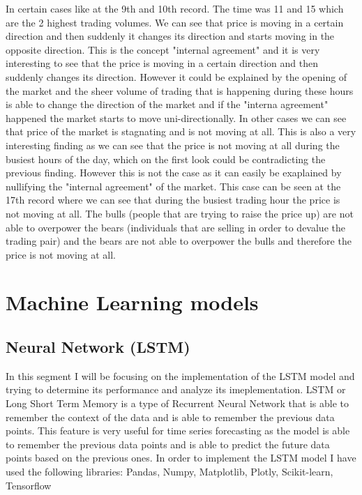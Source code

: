 \documentclass{imc-inf}
\begin{document}
			In certain cases like at the 9th and 10th record. The time was 11 and 15 which are the 2 highest trading volumes. We can see that price is moving in a certain direction and then suddenly it changes its direction and starts moving in the opposite direction.
			This is the concept "internal agreement" and it is very interesting to see that the price is moving in a certain direction and then suddenly changes its direction. However it could be 
			explained by the opening of the market and the sheer volume of trading that is happening during these hours is able to change the direction of the market and if the "interna agreement" happened
			the market starts to move uni-directionally.
			In other cases we can
			see that price of the market is stagnating and is not moving at all. This is also a very interesting finding as we can see that the price is not moving at all during the busiest hours of the day, which 
			on the first look could be contradicting the previous finding. However this is not the case as it can easily be exaplained by nullifying the "internal agreement" of the market.
			This case can be seen at the 17th record where we can see that during the busiest trading hour the price is not moving at all.
			The bulls (people that are trying to raise the price up) are not able to overpower the bears (individuals that are selling in order to devalue the trading pair) and the bears are not able to overpower the bulls and therefore the price is not moving at all. 
			

	\section{Machine Learning models}
		\subsection{Neural Network (LSTM)} 
			In this segment I will be focusing on the implementation of the LSTM model and trying to determine its performance and analyze its imeplementation.
			LSTM or Long Short Term Memory is a type of Recurrent Neural Network that is able to remember the context of the data and is able to remember the previous data points.
			This feature is very useful for time series forecasting as the model is able to remember the previous data points and is able to predict the future data points based on the previous ones.
			In order to implement the LSTM model I have used the following libraries: Pandas, Numpy, Matplotlib, Plotly, Scikit-learn, Tensorflow
\end{document}
